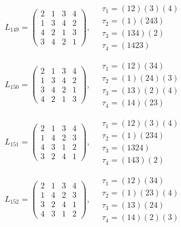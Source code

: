 $L_{149} = \begin{pmatrix} 2 & 1 & 3 & 4 \\ 1 & 3 & 4 & 2 \\ 4 & 2 & 1 & 3 \\ 3 & 4 & 2 & 1 \end{pmatrix}, \quad \begin{matrix} \tau_{1} = (1 2)(3)(4) \\ \tau_{2} = (1)(2 4 3) \\ \tau_{3} = (1 3 4)(2) \\ \tau_{4} = (1 4 2 3) \end{matrix}$

$L_{150} = \begin{pmatrix} 2 & 1 & 3 & 4 \\ 1 & 3 & 4 & 2 \\ 3 & 4 & 2 & 1 \\ 4 & 2 & 1 & 3 \end{pmatrix}, \quad \begin{matrix} \tau_{1} = (1 2)(3 4) \\ \tau_{2} = (1)(2 4)(3) \\ \tau_{3} = (1 3)(2)(4) \\ \tau_{4} = (1 4)(2 3) \end{matrix}$

$L_{151} = \begin{pmatrix} 2 & 1 & 3 & 4 \\ 1 & 4 & 2 & 3 \\ 4 & 3 & 1 & 2 \\ 3 & 2 & 4 & 1 \end{pmatrix}, \quad \begin{matrix} \tau_{1} = (1 2)(3)(4) \\ \tau_{2} = (1)(2 3 4) \\ \tau_{3} = (1 3 2 4) \\ \tau_{4} = (1 4 3)(2) \end{matrix}$

$L_{152} = \begin{pmatrix} 2 & 1 & 3 & 4 \\ 1 & 4 & 2 & 3 \\ 3 & 2 & 4 & 1 \\ 4 & 3 & 1 & 2 \end{pmatrix}, \quad \begin{matrix} \tau_{1} = (1 2)(3 4) \\ \tau_{2} = (1)(2 3)(4) \\ \tau_{3} = (1 3)(2 4) \\ \tau_{4} = (1 4)(2)(3) \end{matrix}$

